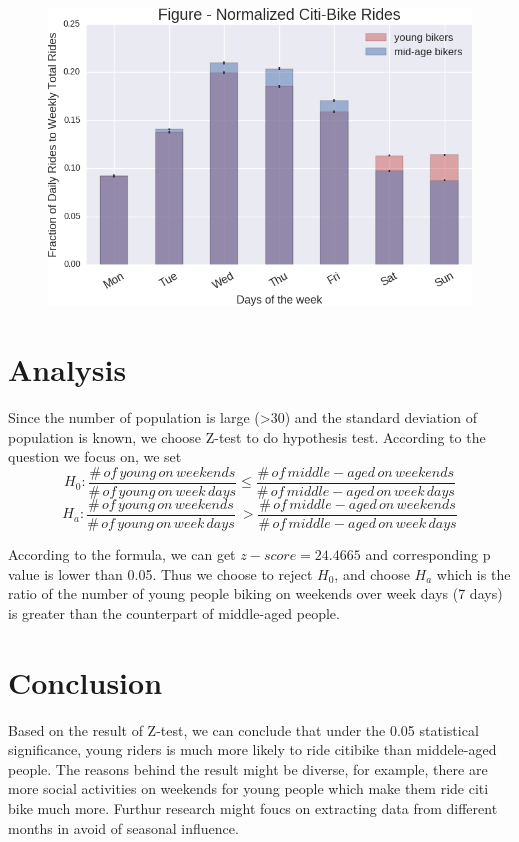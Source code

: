 \documentclass[a4paper, 11pt]{article} %
\begin{document}

\begin{figure}[h]
\centering
\includegraphics[width = 11.5cm ]{image.png}
\end{figure}



\section*{Analysis}
Since the number of population is large (>30) and the standard deviation of population is known, we choose Z-test to do hypothesis test\cite{Z-testvsT-test2}\cite{Z-testvsT-test}. According to the question we focus on, we set 
$$ H_{0}:  \frac{\# \,of\,young\, on\, weekends}{\#\,of\,young\, on \,week \,days} \leqslant \frac{\# \,of\,middle-aged\, on\, weekends}{\#\,of\,middle-aged\, on \,week \,days}$$
$$ H_{a}:  \frac{\# \,of\,young\, on\, weekends}{\#\,of\,young\, on \,week \,days} \ > \frac{\# \,of\,middle-aged\, on\, weekends}{\#\,of\,middle-aged\, on \,week \,days}$$

According to the formula\cite{ProportionZTest}, we can get $z-score = 24.4665$ and corresponding p value is lower than 0.05. Thus we choose to reject $H_{0}$, and choose $H_{a}$ which is the ratio of the number of young people biking on weekends over week days (7 days) is greater than the counterpart of middle-aged people.

\section*{Conclusion}
Based on the result of Z-test, we can conclude that under the 0.05 statistical significance, young riders is much more likely to ride citibike than middele-aged people. The reasons behind the result might be diverse, for example, there are more social activities on weekends for young people which make them ride citi bike much more. Furthur research might foucs on extracting data from different months in avoid of seasonal influence.





\end{document}
